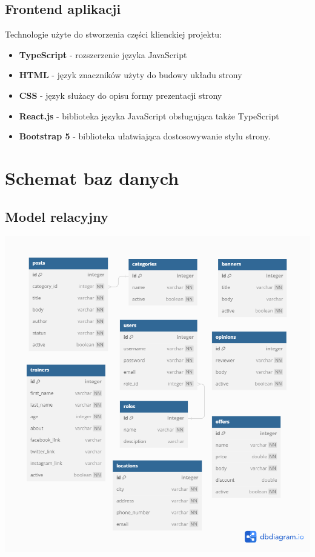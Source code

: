 \documentclass[12pt]{article}
\begin{document}
\subsection{Frontend aplikacji}
Technologie użyte do stworzenia części klienckiej projektu:
\begin{itemize}
\item \textbf{TypeScript} - rozszerzenie języka JavaScript
\item \textbf{HTML} - język znaczników użyty do budowy układu strony
\item \textbf{CSS} - język służacy do opisu formy prezentacji strony
\item \textbf{React.js} - biblioteka języka JavaScript obsługująca także TypeScript
\item \textbf{Bootstrap 5} - biblioteka ułatwiająca dostosowywanie stylu strony.
\end{itemize}
\newpage
\section{Schemat baz danych}
\subsection{Model relacyjny}
\includegraphics[width=1\textwidth, angle=0]{images/Relational.png}
\newpage
\end{document}
